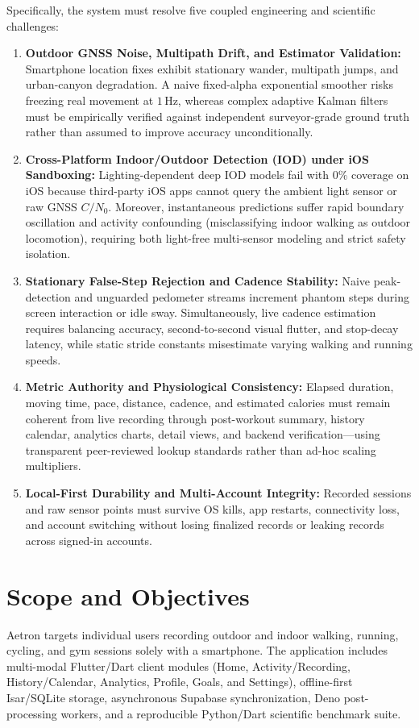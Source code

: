 Specifically, the system must resolve five coupled engineering and scientific challenges:
\begin{enumerate}
    \item \textbf{Outdoor GNSS Noise, Multipath Drift, and Estimator Validation:} Smartphone location fixes exhibit stationary wander, multipath jumps, and urban-canyon degradation. A naive fixed-alpha exponential smoother risks freezing real movement at $1$\,Hz, whereas complex adaptive Kalman filters must be empirically verified against independent surveyor-grade ground truth rather than assumed to improve accuracy unconditionally.
    \item \textbf{Cross-Platform Indoor/Outdoor Detection (IOD) under iOS Sandboxing:} Lighting-dependent deep IOD models fail with $0\%$ coverage on iOS because third-party iOS apps cannot query the ambient light sensor or raw GNSS $C/N_0$. Moreover, instantaneous predictions suffer rapid boundary oscillation and activity confounding (misclassifying indoor walking as outdoor locomotion), requiring both light-free multi-sensor modeling and strict safety isolation.
    \item \textbf{Stationary False-Step Rejection and Cadence Stability:} Naive peak-detection and unguarded pedometer streams increment phantom steps during screen interaction or idle sway. Simultaneously, live cadence estimation requires balancing accuracy, second-to-second visual flutter, and stop-decay latency, while static stride constants misestimate varying walking and running speeds.
    \item \textbf{Metric Authority and Physiological Consistency:} Elapsed duration, moving time, pace, distance, cadence, and estimated calories must remain coherent from live recording through post-workout summary, history calendar, analytics charts, detail views, and backend verification---using transparent peer-reviewed lookup standards rather than ad-hoc scaling multipliers.
    \item \textbf{Local-First Durability and Multi-Account Integrity:} Recorded sessions and raw sensor points must survive OS kills, app restarts, connectivity loss, and account switching without losing finalized records or leaking records across signed-in accounts.
\end{enumerate}

\section{Scope and Objectives}
Aetron targets individual users recording outdoor and indoor walking, running, cycling, and gym sessions solely with a smartphone. The application includes multi-modal Flutter/Dart client modules (Home, Activity/Recording, History/Calendar, Analytics, Profile, Goals, and Settings), offline-first Isar/SQLite storage, asynchronous Supabase synchronization, Deno post-processing workers, and a reproducible Python/Dart scientific benchmark suite.

